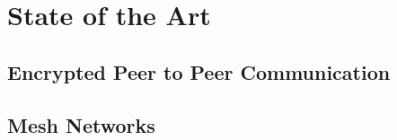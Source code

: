 

\chapter{State of the Art}
\label{chapter:sota}


\section{Encrypted Peer to Peer Communication}


\section{Mesh Networks}


